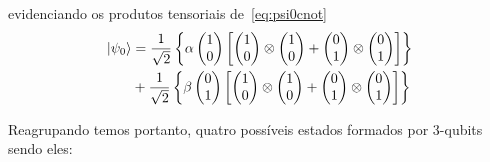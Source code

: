 evidenciando os produtos tensoriais de~\eqref{eq:psi0cnot}
\begin{equation}\label{eq:prodtenspsi0}
	\begin{split}
\ket{\psi_0} &= \frac{1}{\sqrt{2}}\left\{\alpha \begin{pmatrix}
1 \\
0 
\end{pmatrix} \left[ \begin{pmatrix}
1 \\
0 
\end{pmatrix} \otimes \begin{pmatrix}
1 \\
0
\end{pmatrix} + \begin{pmatrix}
0 \\
1
\end{pmatrix} \otimes \begin{pmatrix}
0 \\
1
\end{pmatrix}\right]\right\} \\
&+ \frac{1}{\sqrt{2}}\left\{\beta \begin{pmatrix}
0 \\
1
\end{pmatrix} \left[ \begin{pmatrix}
1 \\
0 
\end{pmatrix} \otimes \begin{pmatrix}
1 \\
0
\end{pmatrix} + \begin{pmatrix}
0 \\
1
\end{pmatrix} \otimes \begin{pmatrix}
0 \\
1
\end{pmatrix}\right]\right\}
	\end{split}
\end{equation}

Reagrupando temos portanto, quatro possíveis estados formados por 3-qubits sendo eles:

